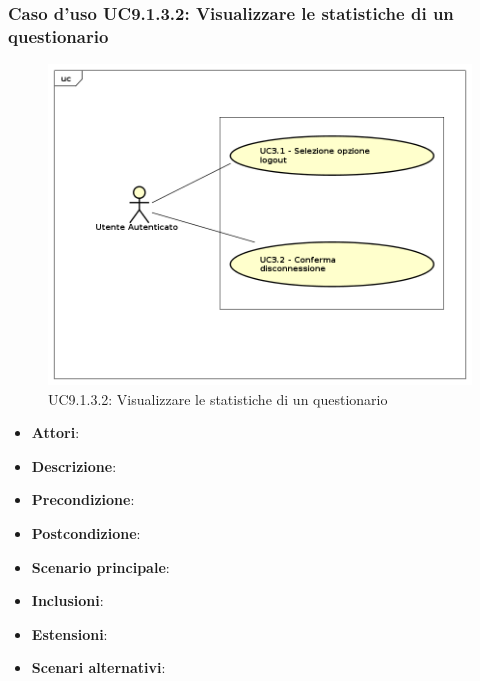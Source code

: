 				\subsubsection{Caso d'uso UC9.1.3.2: Visualizzare le statistiche di un questionario}
				\label{UC9.1.3.2}
				\begin{figure}[h]
					\centering
					\includegraphics[scale=0.7,keepaspectratio]{UML/UC9.png}
					\caption{UC9.1.3.2: Visualizzare le statistiche di un questionario}
				\end{figure}
				\FloatBarrier
				\begin{itemize}
					\item \textbf{Attori}: 
					\item \textbf{Descrizione}: 
					\item \textbf{Precondizione}: 
					\item \textbf{Postcondizione}: 
					\item \textbf{Scenario principale}:
					\item \textbf{Inclusioni}:
					\item \textbf{Estensioni}:
					\item \textbf{Scenari alternativi}:
				\end{itemize}
				
